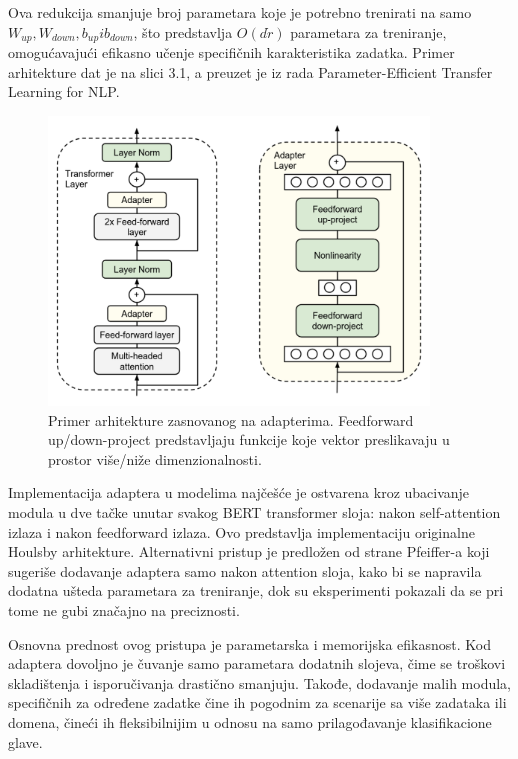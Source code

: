 \documentclass[12pt,oneside]{memoir}
\begin{document}
Ova redukcija smanjuje broj parametara koje je potrebno trenirati na samo \( W_{up}, W_{down}, b_{up} i b_{down}\), što predstavlja \(O(d \dot r)\) parametara za treniranje, omogućavajući efikasno učenje specifičnih karakteristika zadatka. Primer arhitekture dat je na slici 3.1, a preuzet je iz rada Parameter-Efficient Transfer Learning for {NLP}\cite{AdaptersTechnique}.

\begin{figure}[!ht]
	\centering
	\label{fig:AdaptersExample}
	\includegraphics[width=0.9\textwidth]{Adapters_Example.png}
	\caption{Primer arhitekture zasnovanog na adapterima. Feedforward up/down-project predstavljaju funkcije koje vektor preslikavaju u prostor više/niže dimenzionalnosti. }
\end{figure}

Implementacija adaptera u modelima najčešće je ostvarena kroz ubacivanje modula u dve tačke unutar svakog BERT transformer sloja: nakon self-attention izlaza i nakon feedforward izlaza. Ovo predstavlja implementaciju originalne Houlsby \cite{AdaptersTechnique} arhitekture. Alternativni pristup je predložen od strane Pfeiffer-a \cite{pfeiffer2020adapterapplications} koji sugeriše dodavanje adaptera samo nakon attention sloja, kako bi se napravila dodatna ušteda parametara za treniranje, dok su eksperimenti pokazali da se pri tome ne gubi značajno na preciznosti. 

Osnovna prednost ovog pristupa je parametarska i memorijska efikasnost. Kod adaptera dovoljno je čuvanje samo parametara dodatnih slojeva, čime se troškovi skladištenja i isporučivanja drastično smanjuju. Takođe, dodavanje malih modula, specifičnih za određene zadatke čine ih pogodnim za scenarije sa više zadataka ili domena, čineći ih fleksibilnijim u odnosu na samo prilagođavanje klasifikacione glave.
\end{document}

